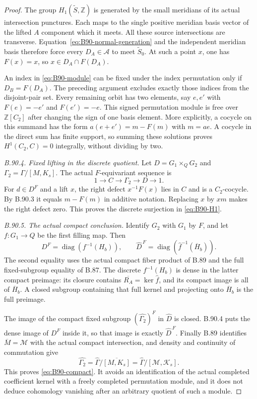 \begin{proof}
The group $H_1(\widetilde S,\mathbb Z)$ is generated by the small
meridians of its actual intersection punctures. Each maps to the
single positive meridian basis vector of the lifted $A$ component
which it meets. All these source intersections are transverse.
Equation~\eqref{eq:B90-normal-generation} and the independent
meridian basis therefore force every $D_A\in\mathscr A$ to
meet $\widetilde S_0$. At such a point $x$, one has $F(x)=x$,
so $x\in D_A\cap F(D_A)$.

An index in \eqref{eq:B90-module} can be fixed under the index
permutation only if $D_B=F(D_A)$. The preceding argument excludes
exactly those indices from the disjoint-pair set. Every remaining
orbit has two elements, say $e,e'$ with $F(e)=-e'$ and
$F(e')=-e$. This signed permutation module is free over
$\mathbb Z[C_2]$ after changing the sign of one basis element.
More explicitly, a cocycle on this summand has the form
$a(e+e')=m-F(m)$ with $m=ae$. A cocycle in the direct sum has
finite support, so summing these solutions proves
$H^1(C_2,C)=0$ integrally, without dividing by two.

\emph{B.90.4. Fixed lifting in the discrete quotient.}
Let $D=G_1\times_QG_2$ and $\Gamma_2=\Gamma/[M,K_s]$.
The actual $F$-equivariant sequence is
\[
 1\longrightarrow C\longrightarrow\Gamma_2
                    \longrightarrow D\longrightarrow1.
\]
For $d\in D^F$ and a lift $x$, the right defect $x^{-1}F(x)$
lies in $C$ and is a $C_2$-cocycle. By B.90.3 it equals
$m-F(m)$ in additive notation. Replacing $x$ by $xm$ makes
the right defect zero. This proves the discrete surjection in
\eqref{eq:B90-H1}.

\emph{B.90.5. The actual compact conclusion.}
Identify $G_2$ with $G_1$ by $F$, and let $f:G_1\to Q$ be
the first filling map. Then
\[
 D^F=\operatorname{diag}(f^{-1}(H_b)),\qquad
 \widehat D^{\,F}
   =\operatorname{diag}(\widehat f^{-1}(\overline H_b)).
\]
The second equality uses the actual compact fiber product of B.89
and the full fixed-subgroup equality of B.87.
The discrete $f^{-1}(H_b)$ is dense in the latter compact preimage:
its closure contains $\overline{R_A}=\ker\widehat f$, and its
compact image is all of $\overline H_b$. A closed subgroup
containing that full kernel and projecting onto $\overline H_b$
is the full preimage.

The image of the compact fixed subgroup
$(\widehat{\Gamma_2})^F$ in $\widehat D$ is closed. B.90.4
puts the dense image of $D^F$ inside it, so that image is exactly
$\widehat D^{\,F}$. Finally B.89 identifies
$\overline M=\mathcal M$ with the actual compact intersection,
and density and continuity of commutation give
\[
 \widehat{\Gamma_2}
 =\widehat\Gamma/\overline{[M,K_s]}
 =\widehat\Gamma/[\mathcal M,\mathcal K_s].
\]
This proves \eqref{eq:B90-compact}. It avoids an identification of
the actual completed coefficient kernel with a freely completed
permutation module, and it does not deduce cohomology vanishing
after an arbitrary quotient of such a module.


\end{proof}
